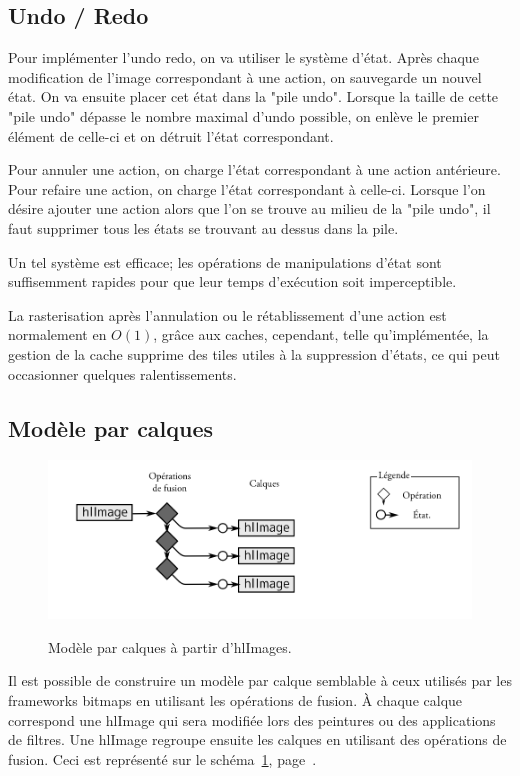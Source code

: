 		\subsection{Undo / Redo}
			Pour implémenter l'undo redo, on va utiliser le système d'état. Après chaque modification de l'image correspondant à une action,
			on sauvegarde un nouvel état. On va ensuite placer cet état dans la "pile undo". 
			Lorsque la taille de cette "pile undo" dépasse le nombre maximal d'undo possible, on enlève le premier élément de celle-ci 
			et on détruit l'état correspondant. 

			Pour annuler une action, on charge l'état correspondant à une action antérieure. Pour refaire une action,
			on charge l'état correspondant à celle-ci. Lorsque l'on désire ajouter une action alors que l'on se trouve au milieu de la "pile undo",
			il faut supprimer tous les états se trouvant au dessus dans la pile. 

			Un tel système est efficace; les opérations de manipulations d'état sont suffisemment rapides pour que leur temps d'exécution
			soit imperceptible.
			
			La rasterisation après l'annulation ou le rétablissement d'une action est normalement en $O(1)$, grâce aux caches, 
			cependant, telle qu'implémentée, la gestion de la cache supprime des tiles utiles à la suppression d'états, ce qui peut occasionner
			quelques ralentissements. 
		\subsection{Modèle par calques}
		\begin{figure}[ht]
			\centering
			\includegraphics[width=\textwidth]{images/hl-calques} 
			\label{fig:hl-calques}
			\caption{Modèle par calques à partir d'hlImages.}
		\end{figure}
			Il est possible de construire un modèle par calque semblable à ceux utilisés par les frameworks bitmaps en utilisant les opérations
			de fusion. À chaque calque correspond une hlImage qui sera modifiée lors des peintures ou des applications de filtres. 
			Une hlImage regroupe ensuite les calques en utilisant des opérations de fusion. Ceci est représenté 
			sur le schéma~\ref{fig:hl-calques}, page~\pageref{fig:hl-calques}. 

